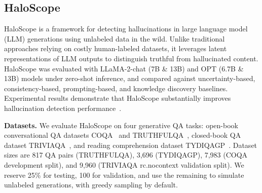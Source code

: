 \subsection{HaloScope}

HaloScope is a framework for detecting hallucinations in large language model
(LLM) generations using unlabeled data in the wild. Unlike traditional approaches
relying on costly human-labeled datasets, it leverages latent representations of
LLM outputs to distinguish truthful from hallucinated content. HaloScope was
evaluated with LLaMA-2-chat (7B \& 13B) and OPT (6.7B \& 13B) models under
zero-shot inference, and compared against uncertainty-based, consistency-based,
prompting-based, and knowledge discovery baselines. Experimental results
demonstrate that HaloScope substantially improves hallucination detection
performance~\cite{du2024haloscope}.

\textbf{Datasets.} We evaluate HaloScope on four generative QA tasks: open-book conversational QA datasets COQA~\cite{reddy2019coqa} and TRUTHFULQA~\cite{lin2022truthfulqa}, closed-book QA dataset TRIVIAQA~\cite{joshi2017triviaqa}, and reading comprehension dataset TYDIQAGP~\cite{clark2020tydiqa}. Dataset sizes are 817 QA pairs (TRUTHFULQA), 3,696 (TYDIQAGP), 7,983 (COQA development split), and 9,960 (TRIVIAQA rc.nocontext validation split). We reserve 25\% for testing, 100 for validation, and use the remaining to simulate unlabeled generations, with greedy sampling by default.

